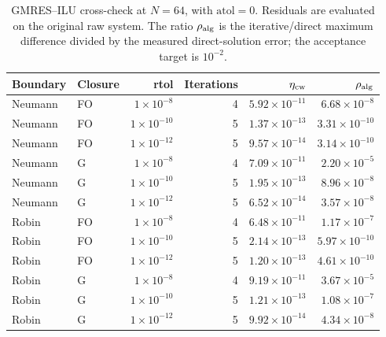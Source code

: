 \begin{table}[H]
\centering
\footnotesize
\setlength{\tabcolsep}{4pt}
\begin{tabular}{llrrrr}
\toprule
Boundary & Closure & rtol & Iterations & $\eta_{\rm cw}$ & $\rho_{\rm alg}$ \\
\midrule
Neumann & FO & $1\times10^{-8}$ & 4 & $5.92\times10^{-11}$ & $6.68\times10^{-8}$ \\
Neumann & FO & $1\times10^{-10}$ & 5 & $1.37\times10^{-13}$ & $3.31\times10^{-10}$ \\
Neumann & FO & $1\times10^{-12}$ & 5 & $9.57\times10^{-14}$ & $3.14\times10^{-10}$ \\
Neumann & G & $1\times10^{-8}$ & 4 & $7.09\times10^{-11}$ & $2.20\times10^{-5}$ \\
Neumann & G & $1\times10^{-10}$ & 5 & $1.95\times10^{-13}$ & $8.96\times10^{-8}$ \\
Neumann & G & $1\times10^{-12}$ & 5 & $6.52\times10^{-14}$ & $3.57\times10^{-8}$ \\
Robin & FO & $1\times10^{-8}$ & 4 & $6.48\times10^{-11}$ & $1.17\times10^{-7}$ \\
Robin & FO & $1\times10^{-10}$ & 5 & $2.14\times10^{-13}$ & $5.97\times10^{-10}$ \\
Robin & FO & $1\times10^{-12}$ & 5 & $1.20\times10^{-13}$ & $4.61\times10^{-10}$ \\
Robin & G & $1\times10^{-8}$ & 4 & $9.19\times10^{-11}$ & $3.67\times10^{-5}$ \\
Robin & G & $1\times10^{-10}$ & 5 & $1.21\times10^{-13}$ & $1.08\times10^{-7}$ \\
Robin & G & $1\times10^{-12}$ & 5 & $9.92\times10^{-14}$ & $4.34\times10^{-8}$ \\
\bottomrule
\end{tabular}
\caption{GMRES--ILU cross-check at $N=64$, with $\mathrm{atol}=0$. Residuals are evaluated on the original raw system. The ratio $\rho_{\rm alg}$ is the iterative/direct maximum difference divided by the measured direct-solution error; the acceptance target is $10^{-2}$.}
\label{tab:gmres-summary}
\end{table}
